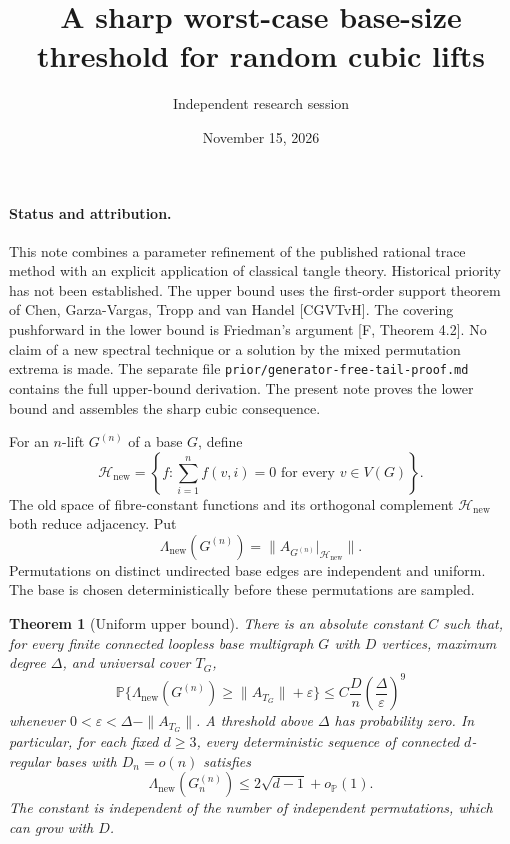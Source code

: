 \documentclass[11pt]{article}
\title{A sharp worst-case base-size threshold for random cubic lifts}
\author{Independent research session}
\date{November 15, 2026}
\newtheorem{theorem}{Theorem}
\newcommand{\Prb}{\mathbb P}
\newcommand{\newsp}{\mathcal H_{\mathrm{new}}}
\begin{document}
\maketitle

\paragraph{Status and attribution.}
This note combines a parameter refinement of the published rational trace
method with an explicit application of classical tangle theory. Historical
priority has not been established. The upper bound uses the first-order
support theorem of Chen, Garza-Vargas, Tropp and van Handel [CGVTvH]. The
covering pushforward in the lower bound is Friedman's argument [F,
Theorem 4.2]. No claim of a new spectral technique or a solution by the
mixed permutation extrema is made. The separate file
\texttt{prior/generator-free-tail-proof.md} contains the full upper-bound
derivation. The present note proves the lower bound and assembles the
sharp cubic consequence.

For an $n$-lift $G^{(n)}$ of a base $G$, define
\[
 \newsp=\left\{f:\sum_{i=1}^n f(v,i)=0\text{ for every }v\in V(G)\right\}.
\]
The old space of fibre-constant functions and its orthogonal complement
$\newsp$ both reduce adjacency. Put
\[
 \Lambda_{\mathrm{new}}(G^{(n)})=
 \|A_{G^{(n)}}|_{\newsp}\|.
\]
Permutations on distinct undirected base edges are independent and uniform.
The base is chosen deterministically before these permutations are sampled.

\begin{theorem}[Uniform upper bound]
There is an absolute constant $C$ such that, for every finite connected
loopless base multigraph $G$ with $D$ vertices, maximum degree $\Delta$,
and universal cover $T_G$,
\[
 \Prb\{\Lambda_{\mathrm{new}}(G^{(n)})\geq
        \|A_{T_G}\|+\varepsilon\}
 \leq C\frac Dn\left(\frac\Delta\varepsilon\right)^9
 \tag{1}
\]
whenever $0<\varepsilon<\Delta-\|A_{T_G}\|$. A threshold above $\Delta$
has probability zero. In particular, for each fixed $d\geq3$, every
deterministic sequence of connected $d$-regular bases with $D_n=o(n)$
satisfies
\[
 \Lambda_{\mathrm{new}}(G_n^{(n)})\leq
 2\sqrt{d-1}+o_{\Prb}(1).
 \tag{2}
\]
The constant is independent of the number of independent permutations,
which can grow with $D$.
\end{theorem}
\end{document}
